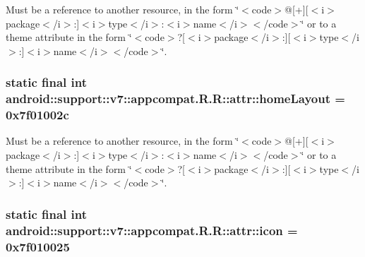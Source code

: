 Must be a reference to another resource, in the form \char`\"{}$<$code$>$@\mbox{[}+\mbox{]}\mbox{[}$<$i$>$package$<$/i$>$:\mbox{]}$<$i$>$type$<$/i$>$:$<$i$>$name$<$/i$>$$<$/code$>$\char`\"{} or to a theme attribute in the form \char`\"{}$<$code$>$?\mbox{[}$<$i$>$package$<$/i$>$:\mbox{]}\mbox{[}$<$i$>$type$<$/i$>$:\mbox{]}$<$i$>$name$<$/i$>$$<$/code$>$\char`\"{}. \hypertarget{classandroid_1_1support_1_1v7_1_1appcompat_1_1_r_1_1attr_806fa1e5334ab62f85d2a7691ad27f50}{
\subsubsection[{homeLayout}]{\setlength{\rightskip}{0pt plus 5cm}static final int android::support::v7::appcompat.R.R::attr::homeLayout = 0x7f01002c}}
\label{classandroid_1_1support_1_1v7_1_1appcompat_1_1_r_1_1attr_806fa1e5334ab62f85d2a7691ad27f50}


Must be a reference to another resource, in the form \char`\"{}$<$code$>$@\mbox{[}+\mbox{]}\mbox{[}$<$i$>$package$<$/i$>$:\mbox{]}$<$i$>$type$<$/i$>$:$<$i$>$name$<$/i$>$$<$/code$>$\char`\"{} or to a theme attribute in the form \char`\"{}$<$code$>$?\mbox{[}$<$i$>$package$<$/i$>$:\mbox{]}\mbox{[}$<$i$>$type$<$/i$>$:\mbox{]}$<$i$>$name$<$/i$>$$<$/code$>$\char`\"{}. \hypertarget{classandroid_1_1support_1_1v7_1_1appcompat_1_1_r_1_1attr_e08d0217dddd341cad051ce71267b470}{
\subsubsection[{icon}]{\setlength{\rightskip}{0pt plus 5cm}static final int android::support::v7::appcompat.R.R::attr::icon = 0x7f010025}}
\label{classandroid_1_1support_1_1v7_1_1appcompat_1_1_r_1_1attr_e08d0217dddd341cad051ce71267b470}


